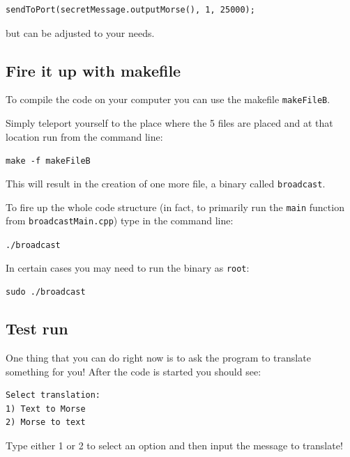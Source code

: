 \documentclass[10pt]{report}
\begin{document}
\begin{lstlisting}
sendToPort(secretMessage.outputMorse(), 1, 25000);
\end{lstlisting}

but can be adjusted to your needs.

\subsection{Fire it up with makefile}

To compile the code on your computer you can use the makefile \verb|makeFileB|.

Simply teleport yourself to the place where the 5 files are placed and at that location run from the command line:

\begin{snugshade}
\verb|make -f makeFileB|
\end{snugshade}

This will result in the creation of one more file, a binary called \verb|broadcast|.

To fire up the whole code structure (in fact, to primarily run the \verb|main| function from \verb|broadcastMain.cpp|) type in the command line:

\begin{snugshade}
\verb|./broadcast|
\end{snugshade}

\newpage

In certain cases you may need to run the binary as \verb|root|:

\begin{snugshade}
\verb|sudo ./broadcast|
\end{snugshade}

\subsection{Test run}

One thing that you can do right now is to ask the program to translate something for you! After the code is started you should see:

\begin{snugshade}
\begin{verbatim}
Select translation:
1) Text to Morse
2) Morse to text
\end{verbatim}
\end{snugshade}

Type either 1 or 2 to select an option and then input the message to translate!
\end{document}
